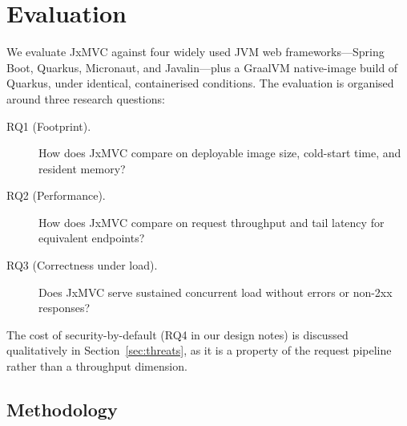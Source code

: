 \section{Evaluation}
\label{sec:eval}

We evaluate JxMVC against four widely used JVM web frameworks---Spring
Boot, Quarkus, Micronaut, and Javalin---plus a GraalVM native-image
build of Quarkus, under identical, containerised conditions. The
evaluation is organised around three research questions:

\begin{description}
  \item[RQ1 (Footprint).] How does JxMVC compare on deployable image
    size, cold-start time, and resident memory?
  \item[RQ2 (Performance).] How does JxMVC compare on request
    throughput and tail latency for equivalent endpoints?
  \item[RQ3 (Correctness under load).] Does JxMVC serve sustained
    concurrent load without errors or non-2xx responses?
\end{description}

\noindent The cost of security-by-default (RQ4 in our design notes) is
discussed qualitatively in Section~\ref{sec:threats}, as it is a
property of the request pipeline rather than a throughput dimension.

\subsection{Methodology}
\label{sec:eval-method}

